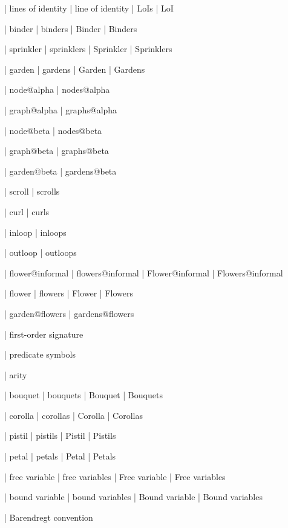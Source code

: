  | lines of identity
 | line of identity
 | LoIs
 | LoI

 | binder
 | binders
 | Binder
 | Binders

 | sprinkler
 | sprinklers
 | Sprinkler
 | Sprinklers

 | garden
 | gardens
 | Garden
 | Gardens

 | node@alpha
 | nodes@alpha

 | graph@alpha
 | graphs@alpha

 | node@beta
 | nodes@beta

 | graph@beta
 | graphs@beta

 | garden@beta
 | gardens@beta


 | scroll
 | scrolls

 | curl
 | curls

 | inloop
 | inloops

 | outloop
 | outloops

 | flower@informal
 | flowers@informal
 | Flower@informal
 | Flowers@informal

 | flower
 | flowers
 | Flower
 | Flowers

 | garden@flowers
 | gardens@flowers

 | first-order signature

 | predicate symbols

 | arity

 | bouquet
 | bouquets
 | Bouquet
 | Bouquets

 | corolla
 | corollas
 | Corolla
 | Corollas

 | pistil
 | pistils
 | Pistil
 | Pistils

 | petal
 | petals
 | Petal
 | Petals

 | free variable
 | free variables
 | Free variable
 | Free variables

 | bound variable
 | bound variables
 | Bound variable
 | Bound variables

 | Barendregt convention

